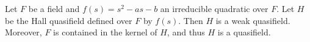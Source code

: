Let $F$ be a field and $f(s) = s^2 - as - b$ an irreducible quadratic over $F$. Let $H$ be the Hall quasifield defined over $F$ by $f(s)$. Then $H$ is a weak quasifield. Moreover, $F$ is contained in the kernel of $H$, and thus $H$ is a quasifield.